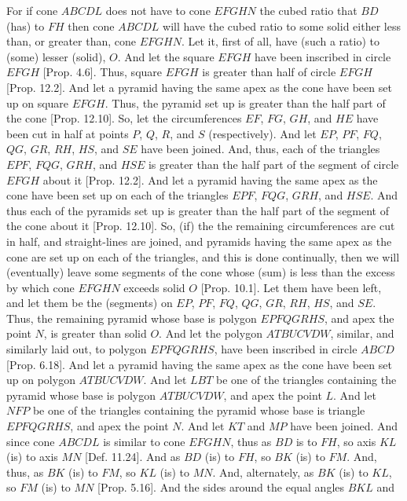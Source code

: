 \begin{Parallel}{}{}
{For if cone $ABCDL$ does not have to cone $EFGHN$ the cubed ratio that $BD$ (has) to $FH$ then cone $ABCDL$ will  have the
cubed ratio to some solid either less than, or greater than, cone $EFGHN$. Let it, first of all, have (such a  ratio) to
(some) lesser (solid), $O$. And let the square $EFGH$ have been inscribed in circle $EFGH$ [Prop. 4.6]. 
Thus, square $EFGH$ is greater than half of circle $EFGH$ [Prop. 12.2]. And let a pyramid having the
same apex as the cone have been set up on square $EFGH$. Thus, the pyramid set up is greater than the half part of the cone [Prop. 12.10]. So, let the circumferences $EF$, $FG$, $GH$, and $HE$ have been cut in half at points $P$, $Q$, $R$, and $S$ (respectively). 
And let $EP$, $PF$, $FQ$, $QG$, $GR$, $RH$, $HS$, and $SE$ have been
joined. And, thus, each of the triangles $EPF$, $FQG$, $GRH$, and $HSE$
is greater than the half part of the segment of circle $EFGH$ about it  [Prop. 12.2]. And let a pyramid having the same apex as
the cone have been set up on each of the triangles $EPF$, $FQG$, $GRH$, and $HSE$. And thus each of the pyramids set up is greater than
the half part of the segment of the cone about it [Prop. 12.10]. So, (if) the the remaining circumferences are cut in half, and 
straight-lines are joined, and pyramids having the same apex as the cone are set up on each of 
the triangles, and this is done continually, then we will (eventually) leave some segments of the 
cone whose (sum) is less than the excess by which cone $EFGHN$ exceeds solid $O$ [Prop. 10.1].
Let them have been left, and let them be the (segments) on $EP$, $PF$, $FQ$, $QG$, $GR$, $RH$, $HS$, and $SE$. Thus, the remaining
pyramid whose base is polygon $EPFQGRHS$, and apex the point $N$, is greater than solid $O$.  And let the polygon
$ATBUCVDW$, similar, and similarly laid out, to polygon $EPFQGRHS$, have been inscribed in circle $ABCD$ [Prop. 6.18].
And let a pyramid having the same apex as the cone have been set up on polygon $ATBUCVDW$. And let $LBT$ be one
of the triangles containing the pyramid whose base is polygon $ATBUCVDW$, and apex the point $L$. And let
$NFP$ be one of the triangles containing the pyramid whose base is triangle $EPFQGRHS$, and apex the point
$N$. And let $KT$ and $MP$ have been joined. And since cone $ABCDL$ is similar to cone $EFGHN$, thus as
$BD$ is to $FH$, so axis $KL$ (is) to axis $MN$ [Def. 11.24].  And as $BD$ (is) to
$FH$, so $BK$ (is) to $FM$. And, thus, as $BK$ (is) to $FM$, so $KL$ (is) to $MN$. And, alternately, as $BK$ (is)
to $KL$, so $FM$ (is) to $MN$ [Prop. 5.16]. And the sides around the equal angles $BKL$ and
}
\end{Parallel}
